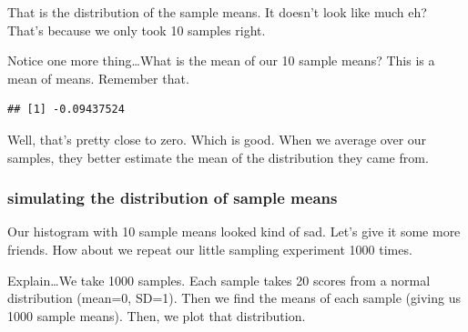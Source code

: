 \documentclass[]{book}
\newenvironment{Shaded}{\begin{snugshade}}{\end{snugshade}}
\newcommand{\KeywordTok}[1]{\textcolor[rgb]{0.13,0.29,0.53}{\textbf{#1}}}
\newcommand{\OperatorTok}[1]{\textcolor[rgb]{0.81,0.36,0.00}{\textbf{#1}}}
\newcommand{\NormalTok}[1]{#1}
\begin{document}
That is the distribution of the sample means. It doesn't look like much
eh? That's because we only took 10 samples right.

Notice one more thing\ldots{}What is the mean of our 10 sample means?
This is a mean of means. Remember that.

\begin{Shaded}
\end{Shaded}

\begin{verbatim}
## [1] -0.09437524
\end{verbatim}

Well, that's pretty close to zero. Which is good. When we average over
our samples, they better estimate the mean of the distribution they came
from.

\subsubsection{simulating the distribution of sample
means}\label{simulating-the-distribution-of-sample-means}

Our histogram with 10 sample means looked kind of sad. Let's give it
some more friends. How about we repeat our little sampling experiment
1000 times.

Explain\ldots{}We take 1000 samples. Each sample takes 20 scores from a
normal distribution (mean=0, SD=1). Then we find the means of each
sample (giving us 1000 sample means). Then, we plot that distribution.
\end{document}
